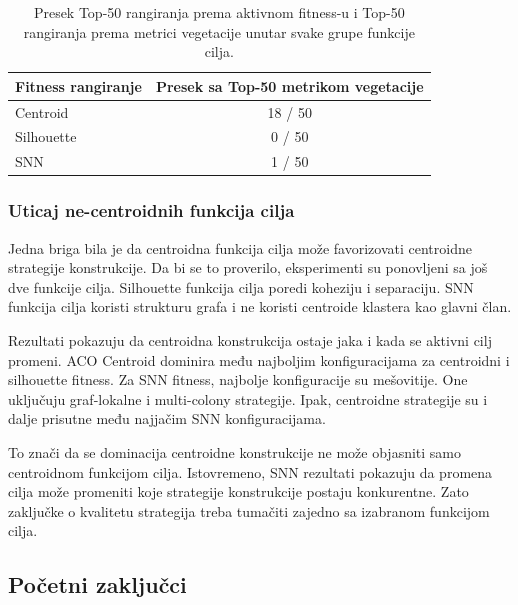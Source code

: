 \documentclass[11pt]{article}
\begin{document}
\begin{table}[ht]
\centering
\caption{Presek Top-50 rangiranja prema aktivnom fitness-u i Top-50 rangiranja prema metrici vegetacije unutar svake grupe funkcije cilja.}
\label{tab:stage1_top50_overlap_within_fitness}
\begin{tabular}{lc}
\hline
\textbf{Fitness rangiranje} & \textbf{Presek sa Top-50 metrikom vegetacije} \\
\hline
Centroid & 18 / 50 \\
Silhouette & 0 / 50 \\
SNN & 1 / 50 \\
\hline
\end{tabular}
\end{table}

\subsubsection{Uticaj ne-centroidnih funkcija cilja}

Jedna briga bila je da centroidna funkcija cilja može favorizovati centroidne strategije konstrukcije. Da bi se to proverilo, eksperimenti su ponovljeni sa još dve funkcije cilja. Silhouette funkcija cilja poredi koheziju i separaciju. SNN funkcija cilja koristi strukturu grafa i ne koristi centroide klastera kao glavni član.

Rezultati pokazuju da centroidna konstrukcija ostaje jaka i kada se aktivni cilj promeni. ACO Centroid dominira među najboljim konfiguracijama za centroidni i silhouette fitness. Za SNN fitness, najbolje konfiguracije su mešovitije. One uključuju graf-lokalne i multi-colony strategije. Ipak, centroidne strategije su i dalje prisutne među najjačim SNN konfiguracijama.

To znači da se dominacija centroidne konstrukcije ne može objasniti samo centroidnom funkcijom cilja. Istovremeno, SNN rezultati pokazuju da promena cilja može promeniti koje strategije konstrukcije postaju konkurentne. Zato zaključke o kvalitetu strategija treba tumačiti zajedno sa izabranom funkcijom cilja.

\subsection{Početni zaključci}
\end{document}
